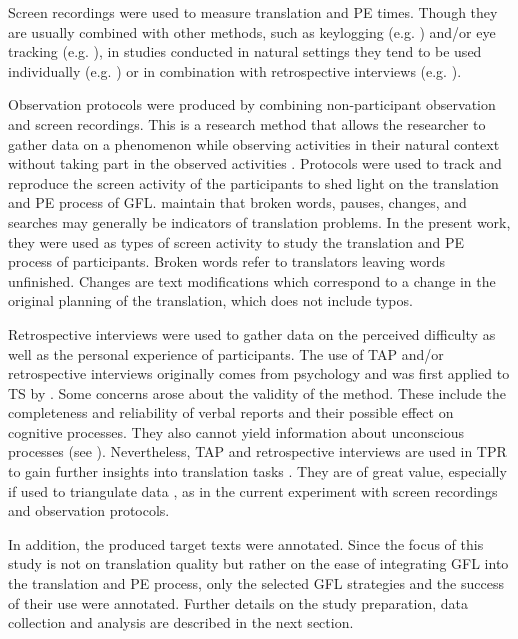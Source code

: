 Screen recordings were used to measure translation and PE times. Though they are usually combined with other methods, such as keylogging (e.g. \cite{rosa2020translation}) and/or eye tracking (e.g. \cite{cui2021consultation}), in studies conducted in natural settings they tend to be used individually (e.g. \cite{kujamaki2010bildschirmvideos}) or in combination with retrospective interviews (e.g. \cite{albl2017professional}). 

Observation protocols were produced by combining non-participant observation and screen recordings. This is a research method that allows the researcher to gather data on a phenomenon while observing activities in their natural context without taking part in the observed activities \citep[609]{liu2010nonparticipant}. Protocols were used to track and reproduce the screen activity of the participants to shed light on the translation and PE process of GFL. \textcite[536]{munoz2019translating} maintain that broken words, pauses, changes, and searches may generally be indicators of translation problems. In the present work, they were used as types of screen activity to study the translation and PE process of participants. Broken words refer to translators leaving words unfinished. Changes are text modifications which correspond to a change in the original planning of the translation, which does not include typos.

Retrospective interviews were used to gather data on the perceived difficulty as well as the personal experience of participants. The use of TAP and/or retrospective interviews originally comes from psychology \citep{ericsson1984protocol} and was first applied to TS by \textcite{krings1986kopfen}. Some concerns arose about the validity of the method. These include the completeness and reliability of verbal reports and their possible effect on cognitive processes. They also cannot yield information about unconscious processes (see \cite{jakobsen2017translation}). Nevertheless, TAP and retrospective interviews are used in TPR to gain further insights into translation tasks \citep{dimitrova2009exploring}. They are of great value, especially if used to triangulate data \citep{jakobsen2017translation}, as in the current experiment with screen recordings and observation protocols. 

In addition, the produced target texts were annotated. Since the focus of this study is not on translation quality but rather on the ease of integrating GFL into the translation and PE process, only the selected GFL strategies and the success of their use were annotated. Further details on the study preparation, data collection and analysis are described in the next section.

